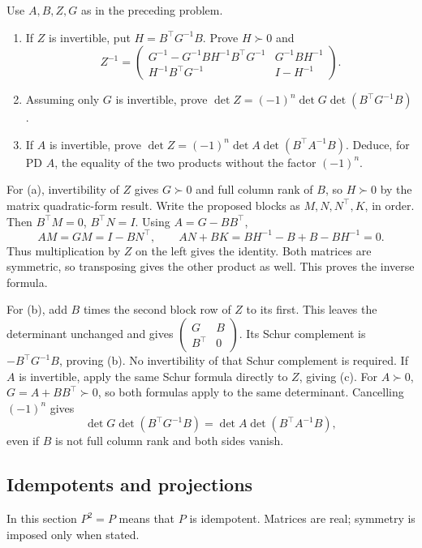 \begin{problem}\label{ex:09:bordered-formulas}
Use \(A,B,Z,G\) as in the preceding problem.
\begin{enumerate}
\item If \(Z\) is invertible, put \(H=B^\top G^{-1}B\).
Prove \(H\succ0\) and
\[
 Z^{-1}=
 \begin{pmatrix}
 G^{-1}-G^{-1}BH^{-1}B^\top G^{-1}&G^{-1}BH^{-1}\\
 H^{-1}B^\top G^{-1}&I-H^{-1}
 \end{pmatrix}.
\]
\item Assuming only \(G\) is invertible, prove
\(\det Z=(-1)^n\det G\det(B^\top G^{-1}B)\).
\item If \(A\) is invertible, prove
\(\det Z=(-1)^n\det A\det(B^\top A^{-1}B)\).
Deduce, for PD \(A\), the equality of the two products without
the factor \((-1)^n\).
\end{enumerate}
\end{problem}
\begin{solution}
For (a), invertibility of \(Z\) gives \(G\succ0\) and full column rank
of \(B\), so \(H\succ0\) by the matrix quadratic-form result.
Write the proposed blocks as \(M,N,N^\top,K\), in order.
Then \(B^\top M=0\), \(B^\top N=I\).
Using \(A=G-BB^\top\),
\[
 AM=GM=I-BN^\top,\qquad
 AN+BK=B H^{-1}-B+B-BH^{-1}=0.
\]
Thus multiplication by \(Z\) on the left gives the identity.
Both matrices are symmetric, so transposing gives the other product
as well. This proves the inverse formula.

For (b), add \(B\) times the second block row of \(Z\) to its first.
This leaves the determinant unchanged and gives
\(\begin{pmatrix}G&B\\B^\top&0\end{pmatrix}\).
Its Schur complement is \(-B^\top G^{-1}B\), proving (b).
No invertibility of that Schur complement is required.
If \(A\) is invertible, apply the same Schur formula directly to \(Z\),
giving (c). For \(A\succ0\), \(G=A+BB^\top\succ0\), so both formulas
apply to the same determinant. Cancelling \((-1)^n\) gives
\[
 \det G\det(B^\top G^{-1}B)=\det A\det(B^\top A^{-1}B),
\]
even if \(B\) is not full column rank and both sides vanish.
\end{solution}

\subsection*{Idempotents and projections}
In this section \(P^2=P\) means that \(P\) is idempotent. Matrices are
real; symmetry is imposed only when stated.

